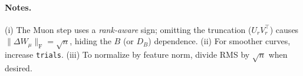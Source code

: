 \documentclass[11pt]{article}
\theoremstyle{definition}
\newcommand{\fro}{\mathrm{F}}
\begin{document}
\paragraph{Notes.} (i) The Muon step uses a \emph{rank-aware} sign; omitting the truncation ($U_rV_r^\top$) causes $\|\Delta W_\mu\|_\fro=\sqrt{n}$, hiding the $B$ (or $D_B$) dependence. (ii) For smoother curves, increase \texttt{trials}. (iii) To normalize by feature norm, divide RMS by $\sqrt{n}$ when desired.
\end{document}
